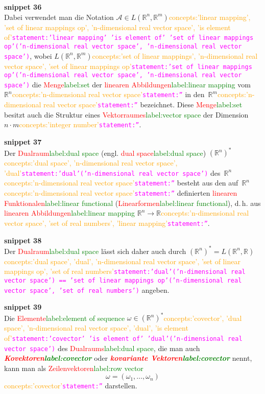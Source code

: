 \documentclass[a4paper,twoside,english,ngerman,deutsch,german,sectrefs,envcountsame,envcountchap]{svmono}
\newcommand{\setref}[2]{\textcolor{red}{#1}\textcolor{green}{#2}}
\newcommand{\snippet}[1]{\textbf{snippet #1}\\}
\newcommand{\eqnote}[2]{\textcolor{orange}{#1}\textcolor{magenta}{\texttt{#2}}}
\begin{document}
\snippet{36}
Dabei verwendet man die Notation $\mathcal{A}\in L({\mathbb{R}}^{n},{\mathbb{R}}^{m})$\eqnote{concepts:'linear mapping', 'set of linear mappings op', 'n-dimensional real vector space', 'is element of'}{statement:'linear mapping' 'is element of' 'set of linear mappings op'('n-dimensional real vector space', 'n-dimensional real vector space')}, wobei $L({\mathbb{R}}^{n},{\mathbb{R}}^{m})$\eqnote{concepts:'set of linear mappings', 'n-dimensional real vector space', 'set of linear mappings op'}{statement:'set of linear mappings op'('n-dimensional real vector space', 'n-dimensional real vector space')} die \setref{Menge}{label:set} der \setref{linearen Abbildungen}{label:linear mapping} vom~${\mathbb{R}}^{n}$\eqnote{concepts:'n-dimensional real vector space'}{statement:''} in den~${\mathbb{R}}^{m}$\eqnote{concepts:'n-dimensional real vector space'}{statement:''} bezeichnet. Diese \setref{Menge}{label:set} besitzt auch die Struktur eines \setref{Vektorraumes}{label:vector space} der Dimension $n\cdot m$\eqnote{concepts:'integer number'}{statement:''}.

\snippet{37}
Der \setref{Dualraum}{label:dual space} (engl. \setref{dual space}{label:dual space}) $({\mathbb{R}}^{n})^{*}$\eqnote{concepts:'dual space', 'n-dimensional real vector space', 'dual'}{statement:'dual'('n-dimensional real vector space')} des~${\mathbb{R}}^{n}$\eqnote{concepts:'n-dimensional real vector space'}{statement:''} besteht aus den auf~${\mathbb{R}}^{n}$\eqnote{concepts:'n-dimensional real vector space'}{statement:''} definierten \setref{linearen Funktionalen}{label:linear functional} (\setref{Linearformen}{label:linear functional}), d.\,h. aus \setref{linearen Abbildungen}{label:linear mapping} ${\mathbb{R}}^{n}\to{\mathbb{R}}$\eqnote{concepts:'n-dimensional real vector space', 'set of real numbers', 'linear mapping'}{statement:''}.

\snippet{38}
Der \setref{Dualraum}{label:dual space} lässt sich daher auch durch $({\mathbb{R}}^{n})^{*}=L({\mathbb{R}}^{n},{\mathbb{R}})$\eqnote{concepts:'dual space', 'dual', 'n-dimensional real vector space', 'set of linear mappings op', 'set of real numbers'}{statement:'dual'('n-dimensional real vector space') == 'set of linear mappings op'('n-dimensional real vector space', 'set of real numbers')} angeben.

\snippet{39}
Die \setref{Elemente}{label:element of sequence} $\omega\in({\mathbb{R}}^{n})^{*}$\eqnote{concepts:'covector', 'dual space', 'n-dimensional real vector space', 'dual', 'is element of'}{statement:'covector' 'is element of' 'dual'('n-dimensional real vector space')} des \setref{Dualraums}{label:dual space}, die man auch \textbf{\em \setref{Kovektoren}{label:covector}} oder \textbf{\em \setref{kovariante Vektoren}{label:covector}} nennt, kann man als \setref{Zeilenvektoren}{label:row vector}
\[
\omega=\left(\omega_{1},\ldots,\omega_{n}\right)
\]\eqnote{concepts:'covector'}{statement:''}
darstellen.
\end{document}
